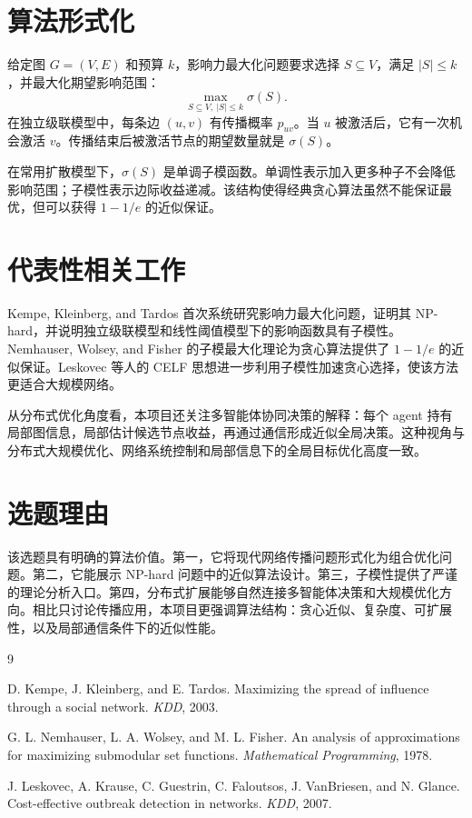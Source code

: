 \documentclass[UTF8, 11pt]{ctexart}
\begin{document}
\section{算法形式化}

给定图 $G=(V,E)$ 和预算 $k$，影响力最大化问题要求选择 $S\subseteq V$，满足 $|S|\leq k$，并最大化期望影响范围：
\[
    \max_{S\subseteq V,\ |S|\leq k} \sigma(S).
\]
在独立级联模型中，每条边 $(u,v)$ 有传播概率 $p_{uv}$。当 $u$ 被激活后，它有一次机会激活 $v$。传播结束后被激活节点的期望数量就是 $\sigma(S)$。

在常用扩散模型下，$\sigma(S)$ 是单调子模函数。单调性表示加入更多种子不会降低影响范围；子模性表示边际收益递减。该结构使得经典贪心算法虽然不能保证最优，但可以获得 $1-1/e$ 的近似保证。

\section{代表性相关工作}

Kempe, Kleinberg, and Tardos 首次系统研究影响力最大化问题，证明其 NP-hard，并说明独立级联模型和线性阈值模型下的影响函数具有子模性。Nemhauser, Wolsey, and Fisher 的子模最大化理论为贪心算法提供了 $1-1/e$ 的近似保证。Leskovec 等人的 CELF 思想进一步利用子模性加速贪心选择，使该方法更适合大规模网络。

从分布式优化角度看，本项目还关注多智能体协同决策的解释：每个 agent 持有局部图信息，局部估计候选节点收益，再通过通信形成近似全局决策。这种视角与分布式大规模优化、网络系统控制和局部信息下的全局目标优化高度一致。

\section{选题理由}

该选题具有明确的算法价值。第一，它将现代网络传播问题形式化为组合优化问题。第二，它能展示 NP-hard 问题中的近似算法设计。第三，子模性提供了严谨的理论分析入口。第四，分布式扩展能够自然连接多智能体决策和大规模优化方向。相比只讨论传播应用，本项目更强调算法结构：贪心近似、复杂度、可扩展性，以及局部通信条件下的近似性能。

\begin{thebibliography}{9}

D. Kempe, J. Kleinberg, and E. Tardos.
\newblock Maximizing the spread of influence through a social network.
\newblock \emph{KDD}, 2003.

G. L. Nemhauser, L. A. Wolsey, and M. L. Fisher.
\newblock An analysis of approximations for maximizing submodular set functions.
\newblock \emph{Mathematical Programming}, 1978.

J. Leskovec, A. Krause, C. Guestrin, C. Faloutsos, J. VanBriesen, and N. Glance.
\newblock Cost-effective outbreak detection in networks.
\newblock \emph{KDD}, 2007.

\end{thebibliography}
\end{document}
